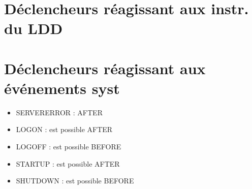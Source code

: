 \documentclass[10pt]{beamer}
\begin{document}
\begin{frame}[allowframebreaks]{\secname}
    
\end{frame}

\begin{frame}[allowframebreaks]{\secname}
    
\end{frame}



\section{Déclencheurs réagissant aux instr. du LDD}

\begin{frame}[allowframebreaks]{\secname}
    
\end{frame}

\begin{frame}[allowframebreaks]{\secname}
    
\end{frame}

\section{Déclencheurs réagissant aux événements syst}
\begin{frame}[allowframebreaks]{\secname}
    
\end{frame}

\begin{frame}[allowframebreaks]{\secname}
    \begin{itemize}
        \item SERVERERROR : AFTER
        \item LOGON : est possible AFTER
        \item LOGOFF : est possible BEFORE
        \item STARTUP : est possible AFTER
        \item SHUTDOWN : est possible BEFORE
    \end{itemize}
\end{frame}

\begin{frame}[allowframebreaks]{\secname}
    
\end{frame}


\end{document}
